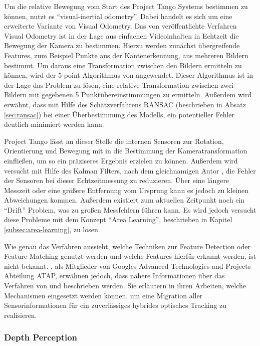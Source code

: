 Um die relative Bewegung vom Start des Project Tango Systems bestimmen zu können, nutzt es \enquote{visual-inertial odometry}. \citep{GoogleDevelopersConcepts:online}
Dabei handelt es sich um eine erweiterte Variante von Visual Odometry. 
Das von \citet{nister2004visual} veröffentlichte Verfahren Visual Odometry ist in der Lage aus einfachen Videoinhalten in Echtzeit die Bewegung der Kamera zu bestimmen. 
Hierzu werden zunächst übergreifende Features, zum Beispiel Punkte aus der \citet{harris1988combined} Kantenerkennung, aus mehreren Bildern bestimmt. Um daraus eine Transformation zwischen den Bildern ermitteln zu können, wird der 5-point Algorithmus von \citet{nister2004efficient} angewendet. Dieser Algorithmus ist in der Lage das Problem zu lösen, eine relative Transformation zwischen zwei Bildern mit gegebenen 5 Punktübereinstimmungen zu ermitteln. Außerdem wird erwähnt, dass mit Hilfe des Schätzverfahrens RANSAC (beschrieben in Absatz \ref{sec:ransac}) bei einer Überbestimmung des Modells, ein potentieller Fehler deutlich minimiert werden kann. 

Project Tango lässt an dieser Stelle die internen Sensoren zur Rotation, Orientierung und Bewegung mit in die Bestimmung der Kameratransformation einfließen, um so ein präziseres Ergebnis erzielen zu können. Außerdem wird versucht mit Hilfe des Kalman Filters, nach dem gleichnamigen Autor \citet{kalman1960new}, die Fehler der Sensoren bei dieser Echtzeitmessung zu reduzieren. Über eine längere Messzeit oder eine größere Entfernung vom Ursprung kann es jedoch zu kleinen Abweichungen kommen. Außerdem existiert zum aktuellen Zeitpunkt noch ein \enquote{Drift} Problem, was zu großen Messfehlern führen kann. Es wird jedoch versucht diese Probleme mit dem Konzept \enquote{Area Learning}, beschrieben in Kapitel \ref{subsec:area-learning}, zu lösen. \citep{GoogleDevelopersConcepts:online}

Wie genau das Verfahren aussieht, welche Techniken zur Feature Detection oder Feature Matching genutzt werden und welche Features hierfür erkannt werden, ist nicht bekannt. \citet{Klingensmith_2015_7924}, als Mitglieder von Googles Advanced Technologies and Projects Abteilung ATAP, erwähnen jedoch, dass nähere Informationen über das Verfahren von \citet{kottas2013consistency} und \citet{mourikis2007multi} beschrieben werden. Sie erläutern in ihren Arbeiten, welche Mechanismen eingesetzt werden können, um eine Migration aller Sensorinformationen für ein zuverlässiges hybrides optisches Tracking zu realisieren.

\subsubsection{Depth Perception}

